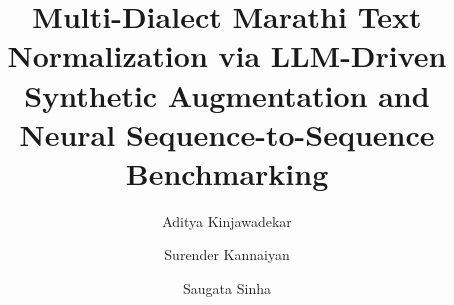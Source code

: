 \documentclass[runningheads]{llncs}
\begin{document}
\title{Multi-Dialect Marathi Text Normalization via LLM-Driven Synthetic Augmentation and Neural Sequence-to-Sequence Benchmarking}

\author{Aditya Kinjawadekar \and
Surender Kannaiyan \and
Saugata Sinha}



\maketitle





\end{document}
